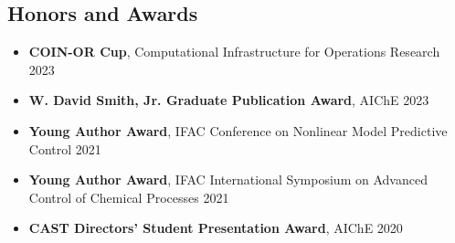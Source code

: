 \documentclass[letterpaper, 11pt]{article}
\begin{document}
\subsection*{Honors and Awards}
\begin{itemize}[leftmargin=*,itemsep=0pt]
\item[] {\bf COIN-OR Cup}, Computational Infrastructure for Operations Research \hfill 2023
\item[] {\bf W. David Smith, Jr. Graduate Publication Award}, AIChE \hfill 2023
\item[] {\bf Young Author Award}, IFAC Conference on Nonlinear Model Predictive Control \hfill 2021
\item[] {\bf Young Author Award}, IFAC International Symposium on Advanced Control of Chemical Processes \hfill 2021
\item[] {\bf CAST Directors' Student Presentation Award}, AIChE \hfill 2020

\end{itemize}
\end{document}
